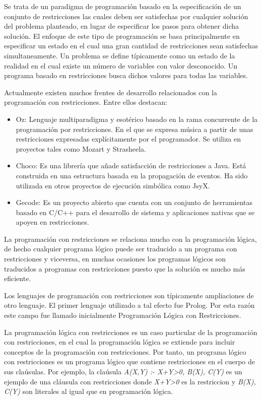 Se trata de un paradigma de programaci\'on basado en la especificaci\'on de un conjunto de restricciones las cuales deben ser satisfechas por cualquier soluci\'on del problema planteado, en lugar de especificar los pasos para obtener dicha soluci\'on. El enfoque de este tipo de programaci\'on se basa principalmente en especificar un estado en el cual una gran cantidad de restricciones sean satisfechas simultaneamente. Un problema se define t\'ipicamente como un estado de la realidad	en el cual existe un n\'umero de variables con valor desconocido. Un programa basado en restricciones busca dichos valores para todas las variables.

Actualmente existen muchos frentes de desarrollo relacionados con la programaci\'on con restricciones. Entre ellos destacan:
\begin{itemize}
\item Oz: Lenguaje multiparadigma y esot\'erico basado en la rama concurrente de la programaci\'on por restricciones. En el que se expresa m\'usica a partir de unas restricciones expresadas expl\'icitamente por el programador. Se utiliza en proyectos tales como Mozart y Strasheela.
\item Choco: Es una librer\'ia que a\~nade satisfacci\'on de restricciones a Java. Est\'a construida en una estructura basada en la propagaci\'on de eventos. Ha sido utilizada en otros proyectos de ejecuci\'on simb\'olica como JsyX.
\item Gecode: Es un proyecto abierto que cuenta con un conjunto de herramientas basado en C/C++ para el desarrollo de sistema y aplicaciones nativas que se apoyen en restricciones.
\end{itemize}

La programaci\'on con restricciones se relaciona mucho con la programaci\'on l\'ogica, de hecho cualquier programa l\'ogico puede ser traducido a un programa con restricciones y viceversa, en muchas ocasiones los programas l\'ogicos son traducidos a programas con restricciones puesto que la soluci\'on es mucho m\'as eficiente. 

Los lenguajes de programaci\'on con restricciones son t\'ipicamente ampliaciones de otro lenguaje. El primer lenguaje utilizado a tal efecto fue Prolog. Por esta raz\'on este campo fue llamado inicialmente Programaci\'on L\'ogica con Restricciones.

La programaci\'on l\'ogica con restricciones es un caso particular de la programaci\'on con restricciones, en el cual la programaci\'on l\'ogica se extiende para incluir conceptos de la programaci\'on con restricciones. Por tanto, un programa l\'ogico con restricciones es un programa l\'ogico que contiene restricciones en el cuerpo de sus cla\'usulas. Por ejemplo, la cla\'usula {\it A(X,Y) :- X+Y>0, B(X), C(Y)} es un ejemplo de una cl\'ausula con restricciones donde {\it X+Y>0} es la restriccion y {\it B(X), C(Y)} son literales al igual que en programaci\'on l\'ogica.

